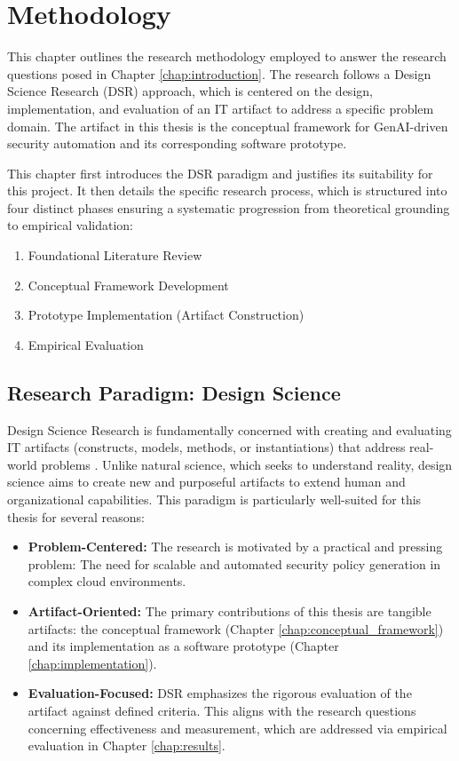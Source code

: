 \chapter{Methodology}
\label{chap:methodology}

This chapter outlines the research methodology employed to answer the research questions posed in Chapter \ref{chap:introduction}. The research follows a Design Science Research (DSR) \cite{hevner_design_2004} approach, which is centered on the design, implementation, and evaluation of an IT artifact to address a specific problem domain. The artifact in this thesis is the conceptual framework for GenAI-driven security automation and its corresponding software prototype.

This chapter first introduces the DSR paradigm and justifies its suitability for this project. It then details the specific research process, which is structured into four distinct phases ensuring a systematic progression from theoretical grounding to empirical validation:

\begin{enumerate}
    \item Foundational Literature Review
    \item Conceptual Framework Development
    \item Prototype Implementation (Artifact Construction)
    \item Empirical Evaluation
\end{enumerate}

\section{Research Paradigm: Design Science}
\label{sec:research_paradigm}

Design Science Research is fundamentally concerned with creating and evaluating IT artifacts (constructs, models, methods, or instantiations) that address real-world problems \cite{hevner_design_2004}. Unlike natural science, which seeks to understand reality, design science aims to create new and purposeful artifacts to extend human and organizational capabilities. This paradigm is particularly well-suited for this thesis for several reasons:
\begin{itemize}
    \item \textbf{Problem-Centered:} The research is motivated by a practical and pressing problem: The need for scalable and automated security policy generation in complex cloud environments.
    \item \textbf{Artifact-Oriented:} The primary contributions of this thesis are tangible artifacts: the conceptual framework (Chapter \ref{chap:conceptual_framework}) and its implementation as a software prototype (Chapter \ref{chap:implementation}).
    \item \textbf{Evaluation-Focused:} DSR emphasizes the rigorous evaluation of the artifact against defined criteria. This aligns with the research questions concerning effectiveness and measurement, which are addressed via empirical evaluation in Chapter \ref{chap:results}.
\end{itemize}

